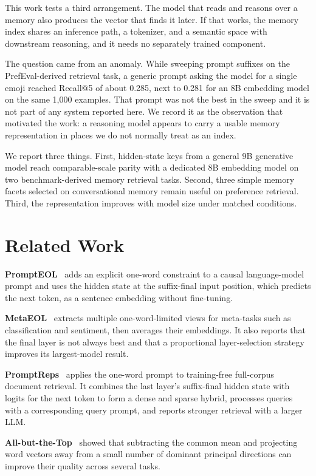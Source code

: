 \documentclass[
  10pt,
  letterpaper,
]{article}
\begin{document}
This work tests a third arrangement. The model that reads and reasons
over a memory also produces the vector that finds it later. If that
works, the memory index shares an inference path, a tokenizer, and a
semantic space with downstream reasoning, and it needs no separately
trained component.

The question came from an anomaly. While sweeping prompt suffixes on
the PrefEval-derived retrieval task, a generic prompt asking the model
for a single emoji reached
Recall@5 of about 0.285, next to 0.281 for an 8B embedding model on the
same 1,000 examples. That prompt was not the best in the sweep and it is
not part of any system reported here. We record it as the observation
that motivated the work: a reasoning model appears to carry a usable
memory representation in places we do not normally treat as an index.

We report three things. First, hidden-state keys from a general 9B
generative model reach comparable-scale parity with a dedicated 8B
embedding model on two benchmark-derived memory retrieval tasks. Second,
three simple memory facets selected on conversational
memory remain useful on preference retrieval. Third, the representation
improves with model size under matched conditions.

\section{Related Work}\label{related-work}

\textbf{PromptEOL}~\cite{jiang2024} adds an explicit one-word constraint to a
causal language-model prompt and uses the hidden state at the
suffix-final input position, which predicts the next token, as a
sentence embedding without fine-tuning.

\textbf{MetaEOL}~\cite{lei2024} extracts multiple one-word-limited views for
meta-tasks such as classification and sentiment, then averages their
embeddings. It also reports that the final layer is not always best and
that a proportional layer-selection strategy improves its largest-model
result.

\textbf{PromptReps}~\cite{zhuang2024} applies the one-word prompt to
training-free full-corpus document retrieval. It combines the last
layer's suffix-final hidden state with logits for the next token to form
a dense and sparse hybrid, processes queries with a corresponding query
prompt, and reports stronger retrieval with a larger LLM.

\textbf{All-but-the-Top}~\cite{mu2018} showed that subtracting the common mean
and projecting word vectors away from a small number of dominant
principal directions can improve their quality across several tasks.
\end{document}
